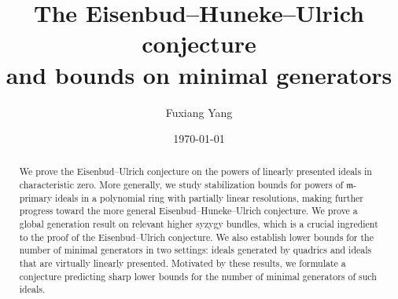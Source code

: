 \documentclass[11pt,letterpaper,reqno]{amsart}
\theoremstyle{definition}
\numberwithin{equation}{section}
\begin{document}
\title[The Eisenbud--Huneke--Ulrich conjecture and bounds on minimal generators]{The Eisenbud--Huneke--Ulrich conjecture\\ and bounds on minimal generators}
\author{Fuxiang Yang}
\address{Department of Mathematics, University of Notre Dame, 255 Hurley, Notre Dame, IN 46556}



\date{\today}

\keywords{}

\begin{abstract}
We prove the Eisenbud--Ulrich conjecture on the powers of linearly presented ideals in characteristic zero. More generally, we study stabilization bounds for powers of $\mathfrak{m}$-primary ideals in a polynomial ring with partially linear resolutions, making further progress toward the more general Eisenbud--Huneke--Ulrich conjecture. We prove a global generation result on relevant higher syzygy bundles, which is a crucial ingredient to the proof of the Eisenbud--Ulrich conjecture. We also establish lower bounds for the number of minimal generators in two settings: ideals generated by quadrics and ideals that are virtually linearly presented. Motivated by these results, we formulate a conjecture predicting sharp lower bounds for the number of minimal generators of such ideals.
\end{abstract}
\maketitle
\end{document}
